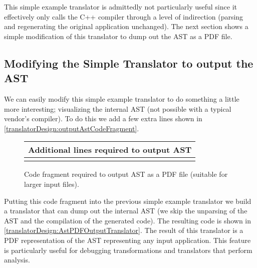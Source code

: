    This simple example translator is admittedly not particularly useful since it effectively
only calls the C++ compiler through a level of indirection (parsing and regenerating
the original application unchanged).  The next section shows a simple modification of this
translator to dump out the AST as a PDF file.


\subsection{Modifying the Simple Translator to output the AST}

   We can easily modify this simple example translator to do something a little more
interesting; visualizing the internal AST (not possible with a typical vendor's compiler).
To do this we add a few extra lines shown in \ref{translatorDesign:outputAstCodeFragment}.

{\indent
{\mySmallFontSize

\begin{latexonly}
%  
\begin{figure}[tb]
\begin{center}
\begin{tabular}{|c|} \hline
     Additional lines required to output AST
\\\hline\hline

\\\hline
\end{tabular}
\end{center}
\caption{ Code fragment required to output AST as a PDF file (suitable for larger input files). }
\end{figure}
\end{latexonly}

\begin{htmlonly}
   
\end{htmlonly}

\label{translatorDesign:outputAstCodeFragment}

}
}

Putting this code fragment into the previous simple example translator we build
a translator that can dump out the internal AST (we skip the unparsing of the AST and
the compilation of the generated code). The resulting code is shown in 
\ref{translatorDesign:AstPDFOutputTranslator}.
The result of this translator is a PDF representation of the AST representing any
input application.  This feature is particularly useful for debugging transformations 
and translators that perform analysis.


